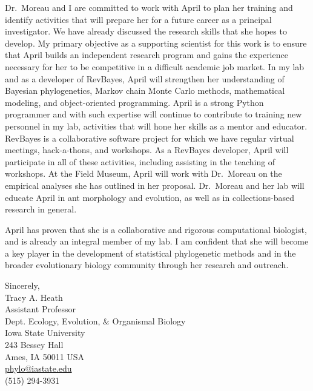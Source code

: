 \documentclass[11pt]{article}
\begin{document}
Dr.~Moreau and I are committed to work with April to plan her training and identify activities that will prepare her for a future career as a principal investigator.
We have already discussed the research skills that she hopes to develop.
My primary objective as a supporting scientist for this work is to ensure that April builds an independent research program and gains the experience necessary for her to be competitive in a difficult academic job market.
In my lab and as a developer of RevBayes, April will strengthen her understanding of Bayesian phylogenetics, Markov chain Monte Carlo methods, mathematical modeling, and object-oriented programming.
April is a strong Python programmer and with such expertise will continue to contribute to training new personnel in my lab, activities that will hone her skills as a mentor and educator. 
RevBayes is a collaborative software project for which we have regular virtual meetings, hack-a-thons, and workshops. 
As a RevBayes developer, April will participate in all of these activities, including assisting in the teaching of workshops.
At the Field Museum, April will work with Dr.~Moreau on the empirical analyses she has outlined in her proposal.
Dr.~Moreau and her lab will educate April in ant morphology and evolution, as well as in collections-based research in general. 

April has proven that she is a collaborative and rigorous computational biologist, and is already an integral member of my lab. 
I am confident that she will become a key player in the development of statistical phylogenetic methods and in the broader evolutionary biology community through her research and outreach.

\vspace{6mm}
\noindent Sincerely,\\
\noindent Tracy A. Heath\\
Assistant Professor\\
Dept. Ecology, Evolution, \& Organismal Biology\\
Iowa State University\\
243 Bessey Hall\\
Ames, IA 50011 USA\\
\href{mailto:phylo@iastate.edu}{{phylo@iastate.edu}}\\
(515) 294-3931
\end{document}
